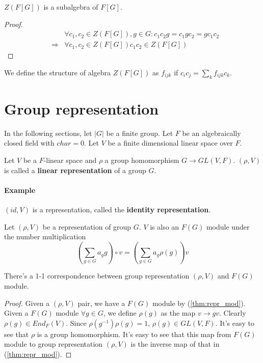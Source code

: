 \documentclass[12pt]{book}
\begin{document}
	\begin{theorem}
		$Z(F[G])$ is a subalgebra of $F[G]$.
	\end{theorem}
	\begin{proof}
		\begin{eqnarray}
			&&\forall c_1,c_2\in Z(F[G]),g\in G: c_1c_2g=c_1gc_2=gc_1c_2\\
			&\Rightarrow& \forall c_1,c_2\in Z(F[G]) c_1c_2\in Z(F[G])
		\end{eqnarray}
	\end{proof}
	
	\begin{definition}
		We define the structure of algebra $Z(F[G])$ as $f_{ijk}$ if $c_ic_j=\sum_k f_{ijk} c_k$.
	\end{definition}
	
	\section{Group representation}
	
	In the following sections, let $|G|$ be a finite group. Let $F$ be an algebraically closed field with $char=0$. Let $V$ be a finite dimensional linear space over $F$.
	
	\begin{definition}		
		Let $V$ be a $F$-linear space and $\rho$ a group homomorphism $G\rightarrow GL(V,F)$. $(\rho,V)$ is called a \textbf{linear representation} of a group $G$.
	\end{definition}
	
	\paragraph{Example} $(id,V)$ is a representation, called the \textbf{identity representation}.
	
	\begin{theorem}
		Let $(\rho,V)$ be a representation of group $G$. $V$ is also an $F(G)$ module under the number multiplication
		\begin{equation}
			(\sum_{g\in G} a_g g)\circ v=(\sum_{g\in G} a_g \rho(g))v
		\end{equation}
		\label{thm:repr_mod}
	\end{theorem}
	
	\begin{theorem}
		There's a 1-1 correspondence between group representation $(\rho,V)$ and $F(G)$ module.
	\end{theorem}
	\begin{proof}
		Given a $(\rho,V)$ pair, we have a $F(G)$ module by (\ref{thm:repr_mod}). Given a $F(G)$ module $\forall g\in G$, we define $\rho(g)$ as the map $v\rightarrow gv$. Clearly $\rho(g)\in End_F(V)$. Since $\rho(g^{-1})\rho(g)=1$, $\rho(g)\in GL(V,F)$. It's easy to see that $\rho$ is a group homomorphism. It's easy to see that this map from $F(G)$ module to group representation $(\rho,V)$ is the inverse map of that in (\ref{thm:repr_mod}).
	\end{proof}
	
\end{document}
